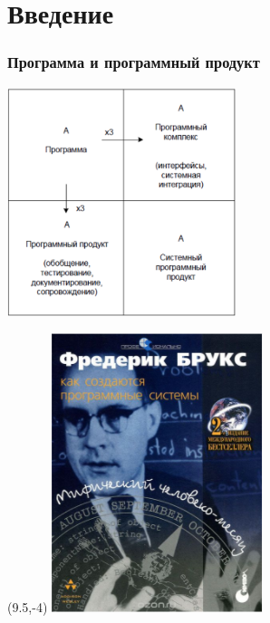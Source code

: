 \documentclass{../slides-style}
\begin{document}
    \section{Введение}

    \begin{frame}
        \frametitle{Программа и программный продукт}
        \begin{center}
            \includegraphics[width=0.5\textwidth]{brooksSquare.png}
        \end{center}
        \begin{textblock}{2}(9.5,-4)
            \includegraphics[width=\textwidth]{brooksCover.png}
        \end{textblock}
    \end{frame}
\end{document}
